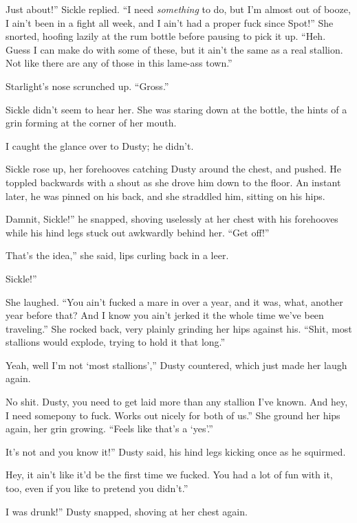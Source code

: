 \leavevmode{}Just about!” Sickle replied. “I need \textit{something} to do, but I’m almost out of booze, I ain’t been in a fight all week, and I ain’t had a proper fuck since Spot!” She snorted, hoofing lazily at the rum bottle before pausing to pick it up. “Heh. Guess I can make do with some of these, but it ain’t the same as a real stallion. Not like there are any of those in this lame-ass town.”

Starlight’s nose scrunched up. “Gross.”

Sickle didn’t seem to hear her. She was staring down at the bottle, the hints of a grin forming at the corner of her mouth.

I caught the glance over to Dusty; he didn’t.

Sickle rose up, her forehooves catching Dusty around the chest, and pushed. He toppled backwards with a shout as she drove him down to the floor. An instant later, he was pinned on his back, and she straddled him, sitting on his hips.

\leavevmode{}Damnit, Sickle!” he snapped, shoving uselessly at her chest with his forehooves while his hind legs stuck out awkwardly behind her. “Get off!”

\leavevmode{}That’s the idea,” she said, lips curling back in a leer.

\leavevmode{}Sickle!”

She laughed. “You ain’t fucked a mare in over a year, and it was, what, another year before that? And I know you ain’t jerked it the whole time we’ve been traveling.” She rocked back, very plainly grinding her hips against his. “Shit, most stallions would explode, trying to hold it that long.”

\leavevmode{}Yeah, well I’m not ‘most stallions’,” Dusty countered, which just made her laugh again.

\leavevmode{}No shit. Dusty, you need to get laid more than any stallion I’ve known. And hey, I need somepony to fuck. Works out nicely for both of us.” She ground her hips again, her grin growing. “Feels like that’s a ‘yes’.”

\leavevmode{}It’s not and you know it!” Dusty said, his hind legs kicking once as he squirmed.

\leavevmode{}Hey, it ain’t like it’d be the first time we fucked. You had a lot of fun with it, too, even if you like to pretend you didn’t.”

\leavevmode{}I was drunk!” Dusty snapped, shoving at her chest again.

